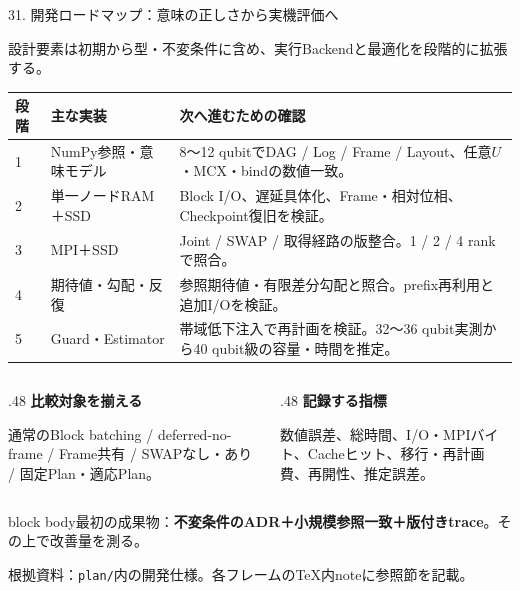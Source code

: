 \documentclass[aspectratio=169,10pt,hyperref={unicode,hidelinks}]{beamer}
\newcommand{\takeaway}[1]{\par\vspace{2mm}\begin{beamercolorbox}[wd=\textwidth,sep=1.5mm]{block body}\small #1\end{beamercolorbox}\par}
\newcommand{\smallnote}[1]{\par{\footnotesize\color{muted}#1\par}}
\begin{document}






\begin{frame}{31. 開発ロードマップ：意味の正しさから実機評価へ}
  \smallnote{設計要素は初期から型・不変条件に含め、実行Backendと最適化を段階的に拡張する。}
  \footnotesize
  \begin{tabularx}{\textwidth}{@{}p{}p{}X@{}}
    \toprule 段階 & 主な実装 & 次へ進むための確認 \\
    \midrule
    1 & NumPy参照・意味モデル & 8〜12 qubitでDAG / Log / Frame / Layout、任意$U$・MCX・bindの数値一致。\\
    2 & 単一ノードRAM＋SSD & Block I/O、遅延具体化、Frame・相対位相、Checkpoint復旧を検証。\\
    3 & MPI＋SSD & Joint / SWAP / 取得経路の版整合。1 / 2 / 4 rankで照合。\\
    4 & 期待値・勾配・反復 & 参照期待値・有限差分勾配と照合。prefix再利用と追加I/Oを検証。\\
    5 & Guard・Estimator & 帯域低下注入で再計画を検証。32〜36 qubit実測から40 qubit級の容量・時間を推定。\\
    \bottomrule
  \end{tabularx}
  \medskip
  \begin{columns}[T,onlytextwidth]
    \begin{column}{.48\textwidth}
      \textbf{比較対象を揃える}\par
      通常のBlock batching / deferred-no-frame / Frame共有 / SWAPなし・あり / 固定Plan・適応Plan。
    \end{column}
    \begin{column}{.48\textwidth}
      \textbf{記録する指標}\par
      数値誤差、総時間、I/O・MPIバイト、Cacheヒット、移行・再計画費、再開性、推定誤差。
    \end{column}
  \end{columns}
  \takeaway{最初の成果物：\textbf{不変条件のADR＋小規模参照一致＋版付きtrace}。その上で改善量を測る。}
  \smallnote{根拠資料：\texttt{plan/}内の開発仕様。各フレームのTeX内noteに参照節を記載。}
\end{frame}


\end{document}
